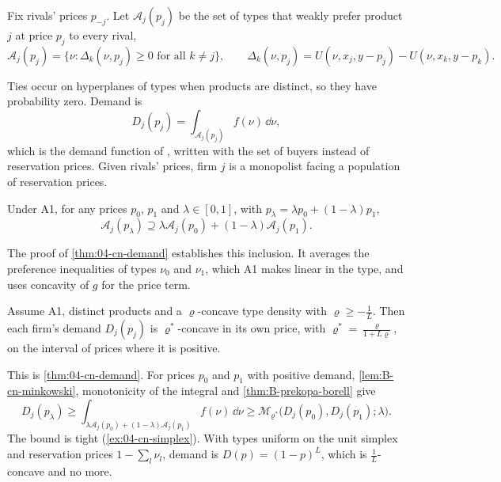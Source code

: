 Fix rivals' prices $p_{-j}$. Let $\mathcal{A}_j(p_j)$ be the set of types that weakly prefer product $j$ at price
$p_j$ to every rival,
\[
  \mathcal{A}_j(p_j) = \bigl\{\nu : \Delta_k(\nu, p_j) \geq 0 \text{ for all } k \neq j\bigr\},
  \qquad \Delta_k(\nu, p_j) = U(\nu, x_j, y - p_j) - U(\nu, x_k, y - p_k)\text{.}
\]

Ties occur on hyperplanes of types when products are distinct, so they have probability zero. Demand is
\begin{equation}\label{eq:B-cn-demand}
  D_j(p_j) = \int_{\mathcal{A}_j(p_j)} f(\nu)\,\dd\nu,
\end{equation}
which is the demand function of \citet[Section 4]{CaplinNalebuff1991}, written with the set of buyers instead of
reservation prices. Given rivals' prices, firm $j$ is a monopolist facing a population of reservation prices.

\begin{lemma}\label{lem:B-cn-minkowski}
Under A1, for any prices $p_0$, $p_1$ and $\lambda \in [0, 1]$, with $p_\lambda = \lambda p_0 + (1 - \lambda)p_1$,
\[
  \mathcal{A}_j(p_\lambda) \supseteq \lambda\mathcal{A}_j(p_0) + (1 - \lambda)\mathcal{A}_j(p_1).
\]
\end{lemma}

The proof of \cref{thm:04-cn-demand} establishes this inclusion. It averages the preference inequalities of
types $\nu_0$ and $\nu_1$, which A1 makes linear in the type, and uses concavity of $g$ for the price term.

\begin{theorem}\label{thm:B-cn-aggregation}
Assume A1, distinct products and a $\varrho$-concave type density with $\varrho \geq -\frac{1}{L}$. Then each firm's demand
$D_j(p_j)$ is $\varrho^*$-concave in its own price, with $\varrho^* = \frac{\varrho}{1 + L\varrho}$, on the interval of prices
where it is positive.
\end{theorem}

This is \cref{thm:04-cn-demand}. For prices $p_0$ and $p_1$ with positive demand, \cref{lem:B-cn-minkowski},
monotonicity of the integral and \cref{thm:B-prekopa-borell} give
\[
  D_j(p_\lambda) \geq \int_{\lambda\mathcal{A}_j(p_0) + (1 - \lambda)\mathcal{A}_j(p_1)} f(\nu)\,\dd\nu
  \geq \mathcal{M}_{\varrho^*}\bigl(D_j(p_0), D_j(p_1); \lambda\bigr).
\]
The bound is tight (\cref{ex:04-cn-simplex}). With types uniform on the unit simplex and reservation prices
$1 - \sum_l\nu_l$, demand is $D(p) = (1 - p)^L$, which is $\frac{1}{L}$-concave and no more.

